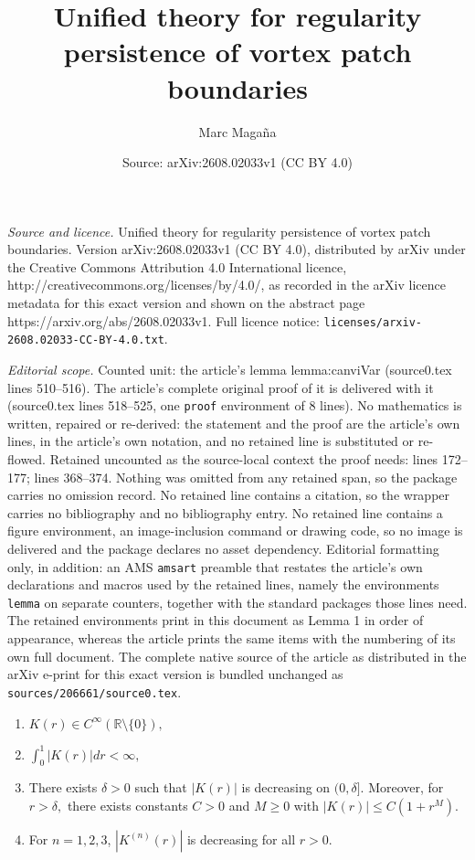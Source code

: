 \documentclass[10pt,a4paper]{amsart}
\title{Unified theory for regularity persistence of vortex patch boundaries}
\author{Marc Maga\~na}
\date{Source: arXiv:2608.02033v1 (CC BY 4.0)}
\newcommand{\R}{\ensuremath{\mathbb{R}}}
\begin{document}
\maketitle

\noindent\emph{Source and licence.} Unified theory for regularity persistence of vortex patch boundaries. Version arXiv:2608.02033v1 (CC BY 4.0), distributed by arXiv under the Creative Commons Attribution 4.0 International licence, http://creativecommons.org/licenses/by/4.0/, as recorded in the arXiv licence metadata for this exact version and shown on the abstract page https://arxiv.org/abs/2608.02033v1. Full licence notice: \texttt{licenses/arxiv-2608.02033-CC-BY-4.0.txt}.\par\smallskip

\noindent\textit{Editorial scope.} Counted unit: the article's lemma lemma:canviVar (source0.tex lines 510--516). The article's complete original proof of it is delivered with it (source0.tex lines 518--525, one \texttt{proof} environment of 8 lines). No mathematics is written, repaired or re-derived: the statement and the proof are the article's own lines, in the article's own notation, and no retained line is substituted or re-flowed.  Retained uncounted as the source-local context the proof needs: lines 172--177; lines 368--374.  Nothing was omitted from any retained span, so the package carries no omission record.  No retained line contains a citation, so the wrapper carries no bibliography and no bibliography entry.  No retained line contains a figure environment, an image-inclusion command or drawing code, so no image is delivered and the package declares no asset dependency.  Editorial formatting only, in addition: an AMS \texttt{amsart} preamble that restates the article's own declarations and macros used by the retained lines, namely the environments \texttt{lemma} on separate counters, together with the standard packages those lines need.  The retained environments print in this document as Lemma 1 in order of appearance, whereas the article prints the same items with the numbering of its own full document.  The complete native source of the article as distributed in the arXiv e-print for this exact version is bundled unchanged as \texttt{sources/206661/source0.tex}.
\begin{enumerate}[label={(A\arabic*)}]
    \item $K(r)\in C^\infty (\R\setminus \{0\}),$ \label{ass:smoothness}
    \item $\int_0^1 |K(r)| dr < \infty,$ \label{ass:integrability}
    \item There exists $ \delta >0$ such that $|K(r)|$ is decreasing on $(0,\delta]$. Moreover, for $r>\delta,$ there exists constants $C>0$ and $M\geq 0$ with $|K(r)|\leq C(1+r^M).$ \label{ass:compKernel}
    \item For $n=1,2,3$, $|K^{(n)}(r)|$ is decreasing for all $r>0$. \label{ass:monotonicity}
\end{enumerate}
\end{document}
